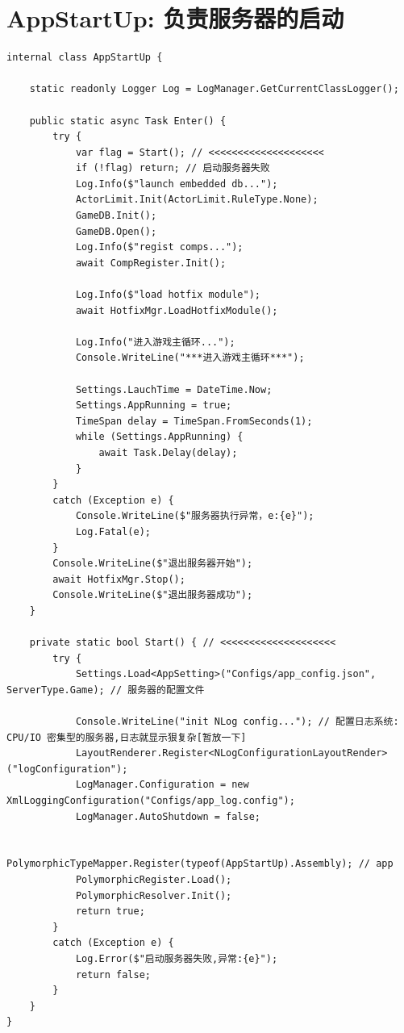 \documentclass[9pt, b5paper]{article}
\begin{document}
\section{AppStartUp: 负责服务器的启动}
\label{sec-4}
\begin{verbatim}
internal class AppStartUp {

    static readonly Logger Log = LogManager.GetCurrentClassLogger();

    public static async Task Enter() {
        try {
            var flag = Start(); // <<<<<<<<<<<<<<<<<<<< 
            if (!flag) return; // 启动服务器失败
            Log.Info($"launch embedded db...");
            ActorLimit.Init(ActorLimit.RuleType.None);
            GameDB.Init();
            GameDB.Open();
            Log.Info($"regist comps...");
            await CompRegister.Init();

            Log.Info($"load hotfix module");
            await HotfixMgr.LoadHotfixModule();

            Log.Info("进入游戏主循环...");
            Console.WriteLine("***进入游戏主循环***");

            Settings.LauchTime = DateTime.Now;
            Settings.AppRunning = true;
            TimeSpan delay = TimeSpan.FromSeconds(1);
            while (Settings.AppRunning) {
                await Task.Delay(delay);
            }
        }
        catch (Exception e) {
            Console.WriteLine($"服务器执行异常，e:{e}");
            Log.Fatal(e);
        }
        Console.WriteLine($"退出服务器开始");
        await HotfixMgr.Stop();
        Console.WriteLine($"退出服务器成功");
    }

    private static bool Start() { // <<<<<<<<<<<<<<<<<<<< 
        try {
            Settings.Load<AppSetting>("Configs/app_config.json", ServerType.Game); // 服务器的配置文件 

            Console.WriteLine("init NLog config..."); // 配置日志系统:　CPU/IO 密集型的服务器,日志就显示狠复杂[暂放一下]
            LayoutRenderer.Register<NLogConfigurationLayoutRender>("logConfiguration");
            LogManager.Configuration = new XmlLoggingConfiguration("Configs/app_log.config");
            LogManager.AutoShutdown = false;

            PolymorphicTypeMapper.Register(typeof(AppStartUp).Assembly); // app
            PolymorphicRegister.Load();
            PolymorphicResolver.Init();
            return true;
        }
        catch (Exception e) {
            Log.Error($"启动服务器失败,异常:{e}");
            return false;
        }
    }
}
\end{verbatim}
\end{document}
